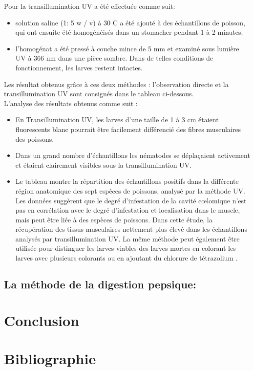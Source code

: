 \documentclass[12pt,a4paper]{article}
\begin{document}
Pour la transillumination UV a été effectuée comme suit: 
\begin{itemize}
\item   solution saline (1: 5 w / v) à 30 \degree C a été ajouté à des échantillons de poisson, qui ont ensuite été homogénéisés dans un stomacher pendant 1 à 2 minutes.
\item l'homogénat a été pressé à couche mince de 5 mm et examiné sous lumière UV à 366 nm dans une pièce sombre. Dans de telles conditions de fonctionnement, les larves restent intactes.
\end{itemize} 
Les résultat obtenus grâce à ces deux méthodes : l’observation directe et la transillumination UV sont consignés dans le tableau ci-dessous.\\  
L'analyse des résultats obtenus comme suit :
\begin{itemize}
\item En Transillumination UV, les larves d'une taille de 1 à 3 cm étaient fluorescents blanc pourrait être facilement différencié des fibres musculaires des poissons.
\item  	Dans un grand nombre d'échantillons les nématodes se déplaçaient activement et étaient clairement visibles sous la transillumination UV.
 \item	Le tableau montre la répartition des échantillons positifs dans la différente région anatomique des sept espèces de poissons, analysé par la méthode UV. Les données suggèrent que le degré d'infestation de la cavité cœlomique n'est pas en corrélation avec le degré d'infestation et localisation dans le muscle, mais peut être liée à des espèces de poissons. Dans cette étude, la récupération des tissus musculaires nettement plus élevé dans les échantillons analysés par transillumination UV. La même méthode peut également être utilisée pour distinguer les larves viables des larves mortes en colorant les larves avec plusieurs colorants ou en ajoutant du chlorure de tétrazolium . 
\end{itemize} 
\subsection {La méthode de la digestion pepsique:}
\newpage


\section*{Conclusion}
\newpage
\section*{Bibliographie}
\end{document}
